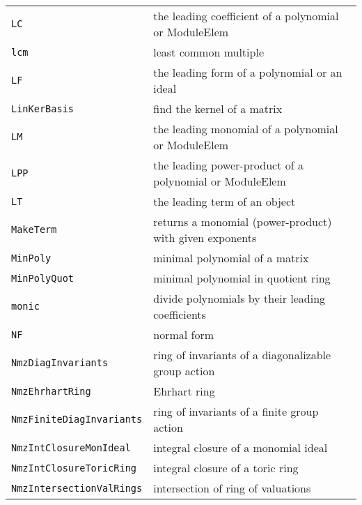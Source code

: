 \documentclass[a4paper]{mybook}
\begin{document}
\begin{center}
\begin{longtable}{ll}
{\verb~LC~} &
      the leading coefficient of a polynomial or ModuleElem\\
   
{\verb~lcm~} &
      least common multiple\\
   
{\verb~LF~} &
      the leading form of a polynomial or an ideal\\
   
{\verb~LinKerBasis~} &
      find the kernel of a matrix\\
   
{\verb~LM~} &
      the leading monomial of a polynomial or ModuleElem\\
   
{\verb~LPP~} &
      the leading power-product of a polynomial or ModuleElem\\
   
{\verb~LT~} &
      the leading term of an object\\
   
{\verb~MakeTerm~} &
      returns a monomial (power-product) with given exponents\\
   
{\verb~MinPoly~} &
      minimal polynomial of a matrix\\
   
{\verb~MinPolyQuot~} &
      minimal polynomial in quotient ring\\
   
{\verb~monic~} &
      divide polynomials by their leading coefficients\\
   
{\verb~NF~} &
      normal form\\
   
{\verb~NmzDiagInvariants~} &
      ring of invariants of a diagonalizable group action\\
   
{\verb~NmzEhrhartRing~} &
      Ehrhart ring\\
   
{\verb~NmzFiniteDiagInvariants~} &
      ring of invariants of a finite group action\\
   
{\verb~NmzIntClosureMonIdeal~} &
      integral closure of a monomial ideal\\
   
{\verb~NmzIntClosureToricRing~} &
      integral closure of a toric ring\\
   
{\verb~NmzIntersectionValRings~} &
      intersection of ring of valuations\\
   

\end{longtable}
\end{center}
\end{document}
